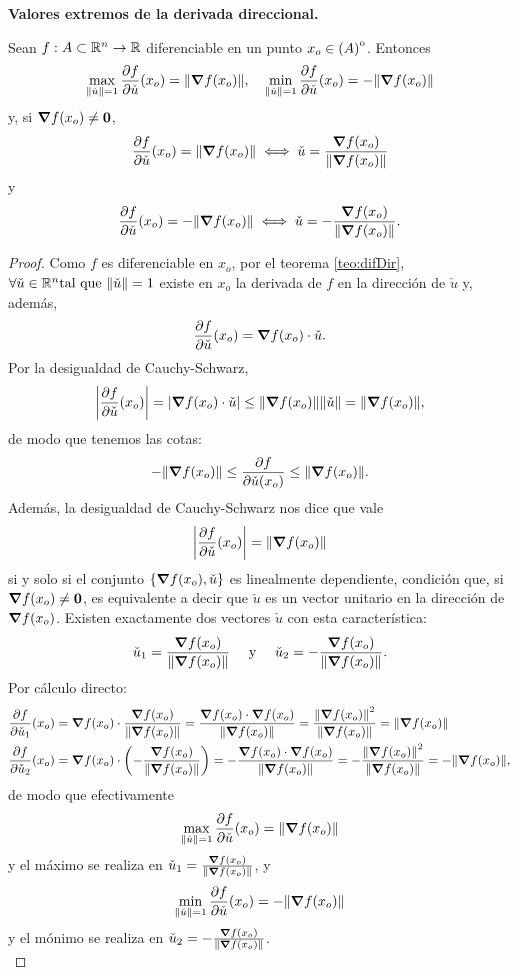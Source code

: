 \begin{theorem}\textbf{Valores extremos de la derivada direccional.} \label{teo:max_deriv}
\mbox{}

 Sean $f: A \subset \mathbb{R}^n \to \mathbb{R}$ diferenciable en un punto $x_o \in {\kern0pt(A)}^{\mathrm{o}}$. Entonces 
 \[
  \max_{\norm{\check{u}} = 1} \frac{\partial f}{\partial \check{u}} (x_o) = \norm{\grad f (x_o)}, \quad 
  \min_{\norm{\check{u}} = 1} \frac{\partial f}{\partial \check{u}} (x_o) = -\norm{\grad f (x_o)}
 \]
y, si $\grad f(x_o) \ne \mathbf{0}$,
\[
 \frac{\partial f}{\partial \check{u}} (x_o) = \norm{\grad f (x_o)} \iff \check{u} = \frac{\grad f(x_o)}{\norm{\grad f(x_o)}}
\]
y
\[
 \frac{\partial f}{\partial \check{u}} (x_o) = -\norm{\grad f (x_o)} \iff \check{u} = -\frac{\grad f(x_o)}{\norm{\grad f(x_o)}}.
\]
\begin{proof}
\mbox{}

 Como $f$ es diferenciable en $x_o$, por el teorema \eqref{teo:difDir}, $\forall \check{u} \in \mathbb{R}^n \text{tal que } \norm{\check{u}} = 1$ existe en $x_o$ la derivada de $f$ en la direcci\'on de $\check{u}$ y, adem\'as,
\[
 \frac{\partial f}{\partial \check{u}} (x_o) = \grad f (x_o) \cdot \check{u}.
\]
Por la desigualdad de Cauchy-Schwarz, 
\[
 \abs{\frac{\partial f}{\partial \check{u}} (x_o)} = \abs{\grad f (x_o) \cdot \check{u}} \le \norm{\grad f (x_o)}\norm{\check{u}} = \norm{\grad f (x_o)},
\]
de modo que tenemos las cotas:
\[
 -\norm{\grad f (x_o)} \le \frac{\partial f}{\partial \check{u} (x_o)} \le \norm{\grad f (x_o)}.
\]
Adem\'as, la desigualdad de Cauchy-Schwarz nos dice que vale
\[
 \abs{\frac{\partial f}{\partial \check{u}} (x_o)} = \norm{\grad f (x_o)}
\]
si y solo si el conjunto $\{\grad f(x_o), \check{u} \}$ es linealmente dependiente, condici\'on que, si $\grad f(x_o) \ne \mathbf{0}$, es equivalente a decir que $\check{u}$ es un vector unitario en la direcci\'on de $\grad f(x_o)$. Existen exactamente dos vectores $\check{u}$ con esta caracter\'istica:
\[
 \check{u}_1 = \frac{\grad f(x_o)}{\norm{\grad f(x_o)}} \quad \text{ y } \quad \check{u}_2 = -\frac{\grad f(x_o)}{\norm{\grad f(x_o)}}.
\]
Por c\'alculo directo:
\begin{align*}
 \frac{\partial f}{\partial \check{u}_1} (x_o) &= \grad f (x_o) \cdot \frac{\grad f(x_o)}{\norm{\grad f(x_o)}} = \frac{ \grad f (x_o) \cdot \grad f(x_o) }{\norm{\grad f(x_o)}} = \frac{\norm{\grad f (x_o)}^2 }{\norm{\grad f(x_o)}} = \norm{\grad f (x_o)} \\
%  
 \frac{\partial f}{\partial \check{u}_2} (x_o) &= \grad f (x_o) \cdot \left( - \frac{\grad f(x_o)}{\norm{\grad f(x_o)}} \right) = -\frac{ \grad f (x_o) \cdot \grad f(x_o) }{\norm{\grad f(x_o)}} = -\frac{\norm{\grad f (x_o)}^2 }{\norm{\grad f(x_o)}} = -\norm{\grad f (x_o)},
\end{align*}
de modo que efectivamente
\[
 \max_{\norm{\check{u}}=1} \frac{\partial f}{\partial \check{u}} (x_o) = \norm{\grad f (x_o)}
\]
y el m\'aximo se realiza en $\check{u}_1 = \frac{\grad f(x_o)}{\norm{\grad f(x_o)}}$,
y
\[
 \min_{\norm{\check{u}}=1} \frac{\partial f}{\partial \check{u}} (x_o) = -\norm{\grad f (x_o)}
\]
y el m\'onimo se realiza en $\check{u}_2 = -\frac{\grad f(x_o)}{\norm{\grad f(x_o)}}$. \\


\end{proof}
\end{theorem}
